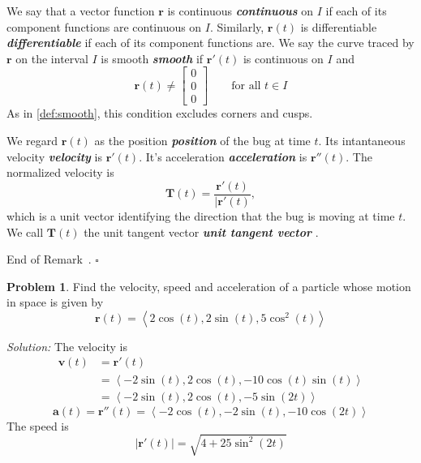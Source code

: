 \documentclass[10pt]{article}
\DeclareRobustCommand{\demph}[1]{%
  \ifmmode
  {\color{Blue}#1}%
  \else
  {\color{Blue}\bfseries\slshape #1}%
  \fi
}
\newtheorem{remark}[theorem]{Remark}
\theoremstyle{definition}
\newtheorem{problem}[theorem]{Problem}
\renewenvironment{remark}
{\begin{oldremark}} 
  {\par\smallskip\hfill   End of Remark~\theremark. $\square$    \par\end{oldremark}}
\newcommand{\1}[1]{\textbf{1}_{\left[#1\right]}} %
\begin{document}
We say that a vector function $\boldsymbol{r}$ is \demph{continuous} on $I$ if
each of its component functions are continuous on $I$. Similarly,
$\boldsymbol{r}(t)$ is \demph{differentiable} if each of its component
functions are. We say the curve traced by $\boldsymbol{r}$ on the interval $I$
is \demph{smooth} if $\boldsymbol{r}'(t)$ is continuous on $I$ and
\begin{equation*}
  \boldsymbol{r}(t)\neq
  \begin{bmatrix}
    0\\0\\0
  \end{bmatrix}
  \qquad \text{for all }t\in I
\end{equation*}
As in \cref{def:smooth}, this condition excludes corners and cusps.

\begin{remark}[Interpretation]
  We regard $\boldsymbol{r}(t)$ as the \demph{position} of the bug at time $t$. Its
  intantaneous \demph{velocity} is $\boldsymbol{r}'(t)$. It's
  \demph{acceleration} is $\boldsymbol{r}''(t)$. The normalized velocity is
  \begin{equation*}
    \boldsymbol{T}(t) = \frac{\boldsymbol{r}'(t)}{|\boldsymbol{r}'(t)},
  \end{equation*}
  which is a unit vector identifying the direction that the bug is moving at
  time $t$. We call $\boldsymbol{T}(t)$ the \demph{unit tangent vector}.
\end{remark}




\begin{problem}
  Find the velocity, speed and acceleration of a particle whose motion in
  space is given by
  \begin{equation*}
    \boldsymbol{r}(t) = \left\langle 2\cos(t), 2\sin(t), 5\cos^{2}(t) \right\rangle 
  \end{equation*}


  \textit{Solution:} The velocity is
  \begin{align*}
    \boldsymbol{v}(t) 
    &= \boldsymbol{r}'(t) \\
    &= \left\langle -2\sin(t), 2\cos(t), -10\cos(t)\sin(t) \right\rangle \\
    &= \left\langle -2\sin(t), 2\cos(t), -5\sin(2t) \right\rangle
  \end{align*}
  \begin{equation*}
    \boldsymbol{a}(t) = \boldsymbol{r}''(t) = \left\langle -2\cos(t), -2\sin(t),  -10\cos(2t)\right\rangle 
  \end{equation*}
  The speed is
  \begin{equation*}
    |\boldsymbol{r}'(t)| = \sqrt{4+25\sin^{2}(2t)}
  \end{equation*}
\end{problem}
\end{document}
